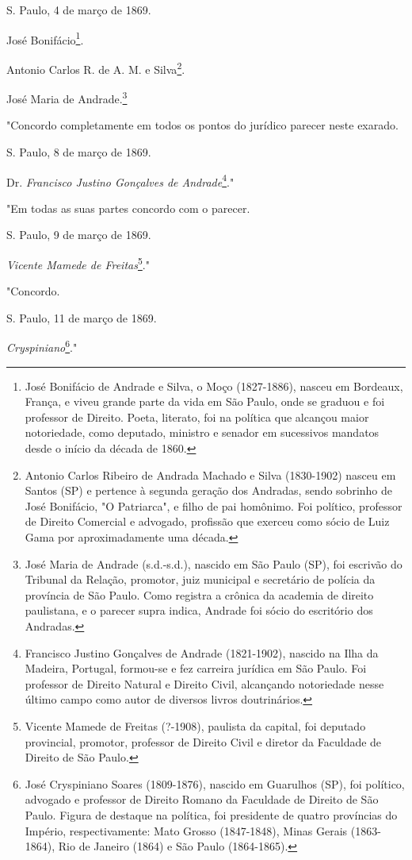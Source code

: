 S. Paulo, 4 de março de 1869.

José Bonifácio\footnote{José Bonifácio de Andrade e Silva, o Moço
  (1827-1886), nasceu em Bordeaux, França, e viveu grande parte da vida
  em São Paulo, onde se graduou e foi professor de Direito. Poeta,
  literato, foi na política que alcançou maior notoriedade, como
  deputado, ministro e senador em sucessivos mandatos desde o início da
  década de 1860.}.

Antonio Carlos R. de A. M. e Silva\footnote{Antonio Carlos Ribeiro de
  Andrada Machado e Silva (1830-1902) nasceu em Santos (SP) e pertence à
  segunda geração dos Andradas, sendo sobrinho de José Bonifácio, "O
  Patriarca", e filho de pai homônimo. Foi político, professor de
  Direito Comercial e advogado, profissão que exerceu como sócio de Luiz
  Gama por aproximadamente uma década.}.

José Maria de Andrade.\footnote{José Maria de Andrade (s.d.-s.d.),
  nascido em São Paulo (SP), foi escrivão do Tribunal da Relação,
  promotor, juiz municipal e secretário de polícia da província de São
  Paulo. Como registra a crônica da academia de direito paulistana, e o
  parecer supra indica, Andrade foi sócio do escritório dos Andradas.}

"Concordo completamente em todos os pontos do jurídico parecer neste
exarado.

S. Paulo, 8 de março de 1869.

Dr. \emph{Francisco Justino Gonçalves de Andrade}\footnote{Francisco
  Justino Gonçalves de Andrade (1821-1902), nascido na Ilha da Madeira,
  Portugal, formou-se e fez carreira jurídica em São Paulo. Foi
  professor de Direito Natural e Direito Civil, alcançando notoriedade
  nesse último campo como autor de diversos livros doutrinários.}."

"Em todas as suas partes concordo com o parecer.

S. Paulo, 9 de março de 1869.

\emph{Vicente Mamede de Freitas}\footnote{Vicente Mamede de Freitas
  (?-1908), paulista da capital, foi deputado provincial, promotor,
  professor de Direito Civil e diretor da Faculdade de Direito de São
  Paulo.}."

"Concordo.

S. Paulo, 11 de março de 1869.

\emph{Cryspiniano}\footnote{José Cryspiniano Soares (1809-1876),
  nascido em Guarulhos (SP), foi político, advogado e professor de
  Direito Romano da Faculdade de Direito de São Paulo. Figura de
  destaque na política, foi presidente de quatro províncias do Império,
  respectivamente: Mato Grosso (1847-1848), Minas Gerais (1863-1864),
  Rio de Janeiro (1864) e São Paulo (1864-1865).}."

